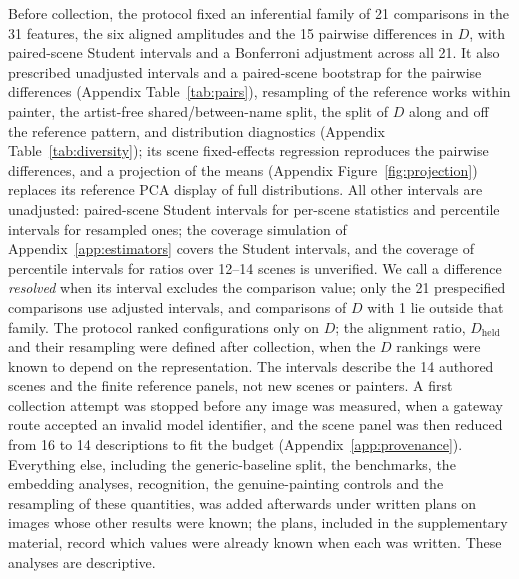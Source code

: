 \documentclass[10pt]{article}
\begin{document}
Before collection, the protocol fixed an inferential family of 21 comparisons in the 31 features,
the six aligned amplitudes and the 15 pairwise differences in $D$, with paired-scene Student
intervals and a Bonferroni adjustment across all 21. It also prescribed unadjusted intervals and a
paired-scene bootstrap for the pairwise differences (Appendix Table~\ref{tab:pairs}), resampling of
the reference works within painter, the artist-free shared/between-name split, the split of $D$
along and off the reference pattern, and distribution diagnostics (Appendix
Table~\ref{tab:diversity}); its scene fixed-effects regression reproduces the pairwise differences,
and a projection of the means (Appendix Figure~\ref{fig:projection}) replaces its reference PCA
display of full distributions. All other intervals are unadjusted: paired-scene Student intervals
for per-scene statistics and percentile intervals for resampled ones; the coverage simulation of
Appendix~\ref{app:estimators} covers the Student intervals, and the coverage of percentile intervals
for ratios over 12--14 scenes is unverified. We call a difference
\emph{resolved} when its interval excludes the comparison value; only the 21 prespecified
comparisons use adjusted intervals, and comparisons of $D$ with 1 lie outside that family. The
protocol ranked configurations only on $D$; the alignment ratio, $D_{\mathrm{held}}$ and their
resampling were defined after collection, when the $D$ rankings were known to depend on the
representation. The
intervals describe the 14 authored scenes and the finite reference panels, not new scenes or
painters. A first collection attempt was stopped before any image was measured, when a gateway
route accepted an invalid model identifier, and the scene panel was then reduced from 16 to 14
descriptions to fit the budget (Appendix~\ref{app:provenance}). Everything else, including the
generic-baseline split, the benchmarks, the embedding analyses, recognition, the genuine-painting
controls and the resampling of these quantities, was added afterwards under written plans on images
whose other results were known; the plans, included in the supplementary material, record which
values were already known when each was written. These analyses are descriptive.
\end{document}
